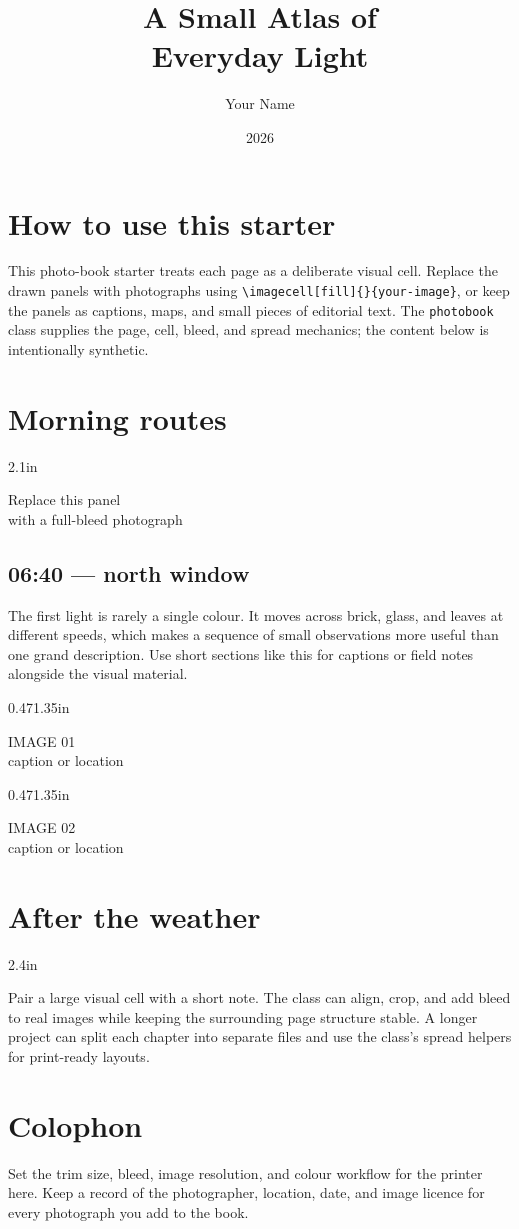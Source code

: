 \documentclass[
  paperwidth=7in,
  paperheight=9in,
  blockwidth=6in,
  blockheight=8in,
  bleed=0.1in
]{photobook}
\title{A Small Atlas of\\Everyday Light}
\author{Your Name}
\date{2026}
\begin{document}
\maketitle
\chapter*{How to use this starter}
This photo-book starter treats each page as a deliberate visual cell. Replace
the drawn panels with photographs using \verb|\imagecell[fill]{}{your-image}|,
or keep the panels as captions, maps, and small pieces of editorial text. The
\texttt{photobook} class supplies the page, cell, bleed, and spread mechanics;
the content below is intentionally synthetic.
\tableofcontents
\chapter{Morning routes}
\begin{inlinecell}{\textwidth}{2.1in}
  \colorbox{night}{\parbox[c][1.9in][c]{\textwidth}{\centering\color{white}
    \fontsize{25}{30}\selectfont Replace this panel\\[-2pt]
    \normalsize with a full-bleed photograph}}
\end{inlinecell}
\section*{06:40 — north window}
The first light is rarely a single colour. It moves across brick, glass, and
leaves at different speeds, which makes a sequence of small observations more
useful than one grand description. Use short sections like this for captions or
field notes alongside the visual material.
\begin{inlinecell}{0.47\textwidth}{1.35in}
  \colorbox{sunset}{\parbox[c][1.15in][c]{0.47\textwidth}{\centering\color{white}
    \Large IMAGE 01\\[-2pt]\small caption or location}}
\end{inlinecell}\hfill
\begin{inlinecell}{0.47\textwidth}{1.35in}
  \colorbox{night}{\parbox[c][1.15in][c]{0.47\textwidth}{\centering\color{white}
    \Large IMAGE 02\\[-2pt]\small caption or location}}
\end{inlinecell}
\chapter{After the weather}
\begin{inlinecell}{\textwidth}{2.4in}
\end{inlinecell}
Pair a large visual cell with a short note. The class can align, crop, and add
bleed to real images while keeping the surrounding page structure stable. A
longer project can split each chapter into separate files and use the class's
spread helpers for print-ready layouts.
\chapter*{Colophon}
Set the trim size, bleed, image resolution, and colour workflow for the printer
here. Keep a record of the photographer, location, date, and image licence for
every photograph you add to the book.
\end{document}
